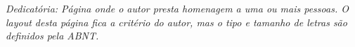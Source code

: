 


\begin{newpage}
	\thispagestyle{empty}
	\setlength{\baselineskip}{1.5\baselineskip} %
	\begin{flushright}
	
		\begin{minipage}{12cm} 
		\vspace{15cm}		
		\textit{Dedicatória: Página onde o autor presta homenagem a uma ou mais pessoas.
                        	O layout desta página fica a critério do autor, mas o tipo e tamanho de letras são definidos pela ABNT.}
		\end{minipage}
	\end{flushright}
\end{newpage}

\clearpage